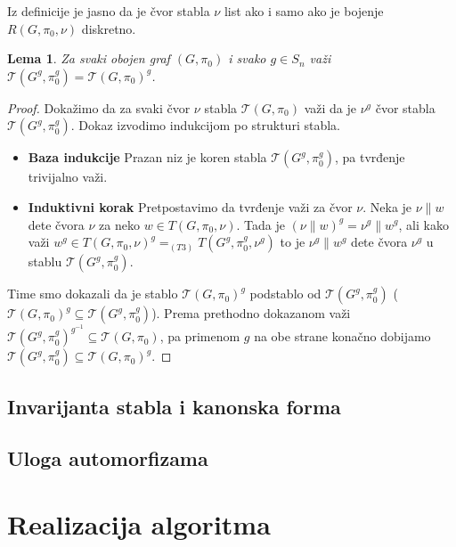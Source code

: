 \documentclass[12pt,oneside]{memoir}
\newtheorem{lemma}{Lema}
\theoremstyle{proof} \newtheorem{proof}{Dokaz}
\theoremstyle{definition} \newtheorem*{definition}{Definicija}
\begin{document}
 Iz definicije je jasno da je čvor stabla $\nu$ list ako i samo ako je bojenje
 $R(G, \pi_0, \nu)$ diskretno.

 \begin{lemma}
	 Za svaki obojen graf $(G, \pi_0)$ i svako $g \in S_n$ važi $\mathcal{T}(G^g, \pi_0^g) = \mathcal{T}(G, \pi_0)^g$.
 \end{lemma}

 \begin{proof}
	 Dokažimo da za svaki čvor $\nu$ stabla $\mathcal{T}(G, \pi_0)$ važi da je
	 $\nu^g$ čvor stabla $\mathcal{T}(G^g, \pi_0^g)$. Dokaz izvodimo indukcijom
	 po strukturi stabla.
	 \begin{itemize}
		 \item[] \textbf{Baza indukcije} Prazan niz je koren stabla
			 $\mathcal{T}(G^g, \pi_0^g)$, pa tvrđenje trivijalno važi.
		 \item[] \textbf{Induktivni korak} Pretpostavimo da tvrđenje važi za
			 čvor $\nu$. Neka je $\nu \| w$ dete čvora $\nu$ za neko $w \in
			 T(G, \pi_0, \nu)$. Tada je $(\nu \| w)^g = \nu^g \| w^g$, ali kako
			 važi $w^g \in T(G, \pi_0, \nu)^g =_{(T3)} T(G^g, \pi_0^g, \nu^g)$
			 to je $\nu^g \| w^g$ dete čvora $\nu^g$ u stablu $\mathcal{T}(G^g,
			 \pi_0^g)$.
	 \end{itemize}
	 Time smo dokazali da je stablo $\mathcal{T}(G, \pi_0)^g$ podstablo od
	 $\mathcal{T}(G^g, \pi_0^g)$ ($\mathcal{T}(G, \pi_0)^g \subseteq
	 \mathcal{T}(G^g, \pi_0^g)$). Prema prethodno dokazanom važi
	 $\mathcal{T}(G^g, \pi_0^g)^{g^{-1}} \subseteq \mathcal{T}(G, \pi_0)$, pa
	 primenom $g$ na obe strane konačno dobijamo $\mathcal{T}(G^g, \pi_0^g)
	 \subseteq \mathcal{T}(G, \pi_0)^g$.
 \end{proof}


 \section{Invarijanta stabla i kanonska forma}

 \section{Uloga automorfizama}

\chapter{Realizacija algoritma}
\end{document}
